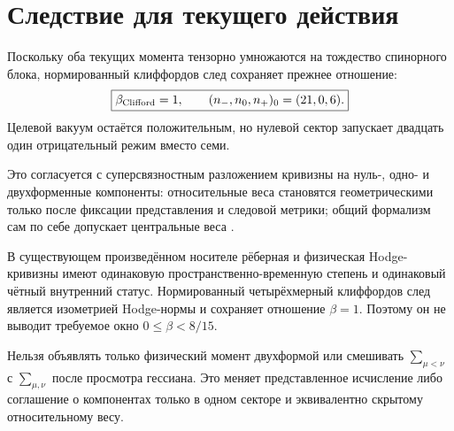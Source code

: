 \section{Следствие для текущего действия}

Поскольку оба текущих момента тензорно умножаются на тождество спинорного
блока, нормированный клиффордов след сохраняет прежнее отношение:
\begin{equation}
 \boxed{\beta_{\rm Clifford}=1,\qquad
 (n_-,n_0,n_+)_{0}=(21,0,6).}
 \label{eq:v7-clifford-derived-weight-signature}
\end{equation}
Целевой вакуум остаётся положительным, но нулевой сектор запускает двадцать
один отрицательный режим вместо семи.

Это согласуется с суперсвязностным разложением кривизны на нуль-, одно- и
двухформенные компоненты: относительные веса становятся геометрическими
только после фиксации представления и следовой метрики; общий формализм сам
по себе допускает центральные веса
\cite{v7-clifford-roepstorff,v7-clifford-spectral-action,
v7-clifford-product-triples}.

\begin{theorem}
В существующем произведённом носителе рёберная и физическая Hodge-кривизны
имеют одинаковую пространственно-временную степень и одинаковый чётный
внутренний статус. Нормированный четырёхмерный клиффордов след является
изометрией Hodge-нормы и сохраняет отношение $\beta=1$. Поэтому он не
выводит требуемое окно $0\le\beta<8/15$.
\end{theorem}

\begin{nogocriterion}
Нельзя объявлять только физический момент двухформой или смешивать
$\sum_{\mu<\nu}$ с $\sum_{\mu,\nu}$ после просмотра гессиана. Это меняет
представленное исчисление либо соглашение о компонентах только в одном
секторе и эквивалентно скрытому относительному весу.
\end{nogocriterion}

